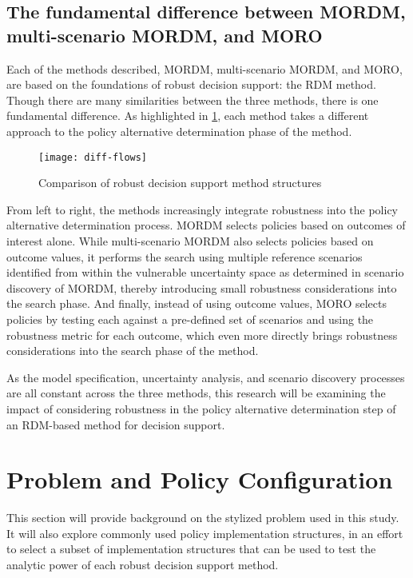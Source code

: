     \subsection{The fundamental difference between MORDM, multi-scenario MORDM, and MORO}

    Each of the methods described, MORDM, multi-scenario MORDM, and MORO, are based on the foundations of robust decision support: the RDM method. Though there are many similarities between the three methods, there is one fundamental difference. As highlighted in \cref{fig:diff-flows}, each method takes a different approach to the policy alternative determination phase of the method.
    
    \begin{figure}[ht]
        \centering
        \captionsetup{justification=centering}
        
        \texttt{[image: diff-flows]}
        \caption{Comparison of robust decision support method structures}
        \label{fig:diff-flows}
    \end{figure}

    From left to right, the methods increasingly integrate robustness into the policy alternative determination process. MORDM selects policies based on outcomes of interest alone. While multi-scenario MORDM also selects policies based on outcome values, it performs the search using multiple reference scenarios identified from within the vulnerable uncertainty space as determined in scenario discovery of MORDM, thereby introducing small robustness considerations into the search phase. And finally, instead of using outcome values, MORO selects policies by testing each against a pre-defined set of scenarios and using the robustness metric for each outcome, which even more directly brings robustness considerations into the search phase of the method.
    
    As the model specification, uncertainty analysis, and scenario discovery processes are all constant across the three methods, this research will be examining the impact of considering robustness in the policy alternative determination step of an RDM-based method for decision support. 

\section{Problem and Policy Configuration}\label{review-problems}
This section will provide background on the stylized problem used in this study. It will also explore commonly used policy implementation structures, in an effort to select a subset of implementation structures that can be used to test the analytic power of each robust decision support method.

